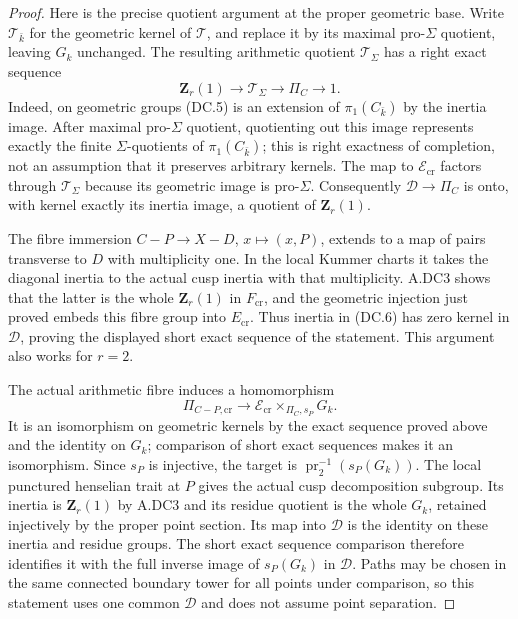 \begin{proof}
Here is the precise quotient argument at the proper geometric base.
Write $\mathcal T_{\bar k}$ for the geometric kernel of $\mathcal T$,
and replace it by its maximal pro-$\Sigma$ quotient, leaving $G_k$
unchanged. The resulting arithmetic quotient $\mathcal T_\Sigma$
has a right exact sequence
\[
 \mathbf Z_r(1)\longrightarrow\mathcal T_\Sigma
 \longrightarrow\Pi_C\longrightarrow1.                        \tag{DC.6}
\]
Indeed, on geometric groups (DC.5) is an extension of $\pi_1(C_{\bar k})$
by the inertia image. After maximal pro-$\Sigma$ quotient, quotienting
out this image represents exactly the finite $\Sigma$-quotients of
$\pi_1(C_{\bar k})$; this is right exactness of completion, not an
assumption that it preserves arbitrary kernels. The map to
$\mathcal E_{\mathrm{cr}}$ factors through $\mathcal T_\Sigma$
because its geometric image is pro-$\Sigma$. Consequently
$\mathcal D\to\Pi_C$ is onto, with kernel exactly its inertia image,
a quotient of $\mathbf Z_r(1)$.

The fibre immersion $C-P\to X-D$, $x\mapsto(x,P)$, extends to a
map of pairs transverse to $D$ with multiplicity one. In the local
Kummer charts it takes the diagonal inertia to the actual cusp inertia
with that multiplicity. A.DC3 shows that the latter is the whole
$\mathbf Z_r(1)$ in $F_{\mathrm{cr}}$, and the geometric injection
just proved embeds this fibre group into $E_{\mathrm{cr}}$. Thus inertia in (DC.6) has
zero kernel in $\mathcal D$, proving the displayed short exact
sequence of the statement. This argument also works for $r=2$.

The actual arithmetic fibre induces a homomorphism
\[
 \Pi_{C-P,\mathrm{cr}}\longrightarrow
 \mathcal E_{\mathrm{cr}}\times_{\Pi_C,s_P}G_k.
\]
It is an isomorphism on geometric kernels by the exact sequence
proved above and the identity
on $G_k$; comparison of short exact sequences makes it an isomorphism.
Since $s_P$ is injective, the target is
$\operatorname{pr}_2^{-1}(s_P(G_k))$. The local punctured henselian
trait at $P$ gives the actual cusp decomposition subgroup. Its
inertia is $\mathbf Z_r(1)$ by A.DC3 and its residue quotient is the
whole $G_k$, retained injectively by the proper point section.
Its map into $\mathcal D$ is the identity on these inertia and
residue groups. The short exact sequence comparison therefore
identifies it with the full inverse image of $s_P(G_k)$ in
$\mathcal D$. Paths may be chosen in the same connected boundary
tower for all points under comparison, so this statement uses one
common $\mathcal D$ and does not assume point separation.


\end{proof}
